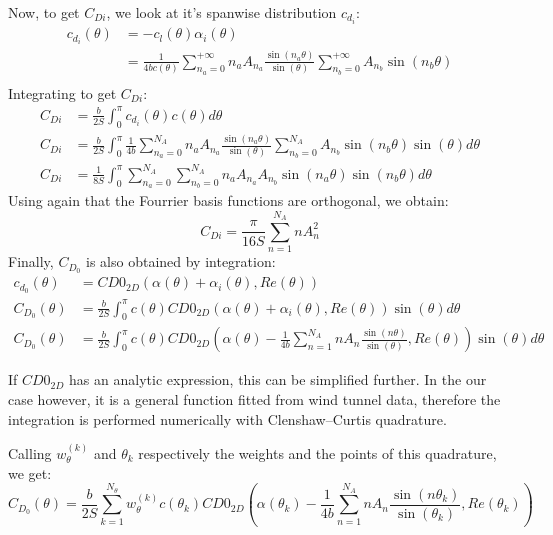 \documentclass[letterpaper,12pt]{article}
\begin{document}
\noindent Now, to get $C_{Di}$, we look at it's spanwise distribution $c_{d_i}$:
\begin{align*}
	c_{d_i} (\theta) &= - c_l (\theta) \alpha_i (\theta) \\
					&=  \frac{1}{4bc(\theta)}\sum_{n_a=0}^{+\infty} n_a A_{n_a} \frac{ \sin(n_a\theta) }{\sin(\theta)} \sum_{n_b=0}^{+\infty} A_{n_b} \sin(n_b\theta) \\
\end{align*}
Integrating to get $C_{Di}$:
\begin{align}
	C_{Di} &= \frac b {2S} \int_{0}^{\pi} c_{d_i}(\theta) c(\theta) d\theta \nonumber\\
	C_{Di} &= \frac b {2S} \int_{0}^{\pi} \frac{1}{4b}
		\sum_{n_a=0}^{N_A} n_a A_{n_a} \frac{ \sin(n_a\theta) }{\sin(\theta)} 
		\sum_{n_b=0}^{N_A} A_{n_b} \sin(n_b\theta) \sin(\theta) 
		d\theta  \nonumber \\ 
	C_{Di} &= \frac 1 {8S} \int_{0}^{\pi} \sum_{n_a=0}^{N_A} \sum_{n_b=0}^{N_A} n_a A_{n_a}A_{n_b} \sin(n_a\theta) \sin(n_b\theta) d\theta
\end{align}
Using again that the Fourrier basis functions are orthogonal, we obtain:
%
\begin{equation}
	\label{eq:cdi}
	C_{Di} = \frac {\pi}{16S} \sum_{n=1}^{N_A} n A_{n}^2
\end{equation}
%
Finally, $C_{D_0}$ is also obtained by integration:
%
\begin{align*}
	c_{d_0}(\theta) &= CD0_{2D}\left( \alpha(\theta) + \alpha_i(\theta), Re(\theta)\right) \\
	C_{D_0}(\theta) &= \frac b {2S} \int_{0}^{\pi} c(\theta) CD0_{2D}\left( \alpha(\theta) + \alpha_i(\theta), Re(\theta)\right) \sin(\theta) d\theta \\
	C_{D_0}(\theta) &= \frac b {2S} \int_{0}^{\pi} c(\theta) CD0_{2D}\left( \alpha(\theta) - \frac {1}{4b}  \sum_{n=1}^{N_A} n A_n \frac{ \sin(n\theta) }{\sin(\theta)} , Re(\theta)\right) \sin(\theta) d\theta
\end{align*}

If $CD0_{2D}$ has an analytic expression, this can be simplified further.
In the our case however, it is a general function fitted from wind tunnel data, 
therefore the integration is performed numerically with Clenshaw–Curtis quadrature. 

Calling $w_{\theta}^{(k)}$ and $\theta_k$ respectively the weights and the points of this quadrature, we get:
\begin{equation}
	\label{eq:cd0}
	C_{D_0}(\theta) = \frac b {2S} \sum_{k=1}^{N_{\theta}} w_{\theta}^{(k)} c(\theta_k) CD0_{2D}\left( \alpha(\theta_k) - \frac {1}{4b} \sum_{n=1}^{N_A} n A_n \frac{ \sin(n\theta_k) }{\sin(\theta_k)} , Re(\theta_k)\right)
\end{equation}
\end{document}
